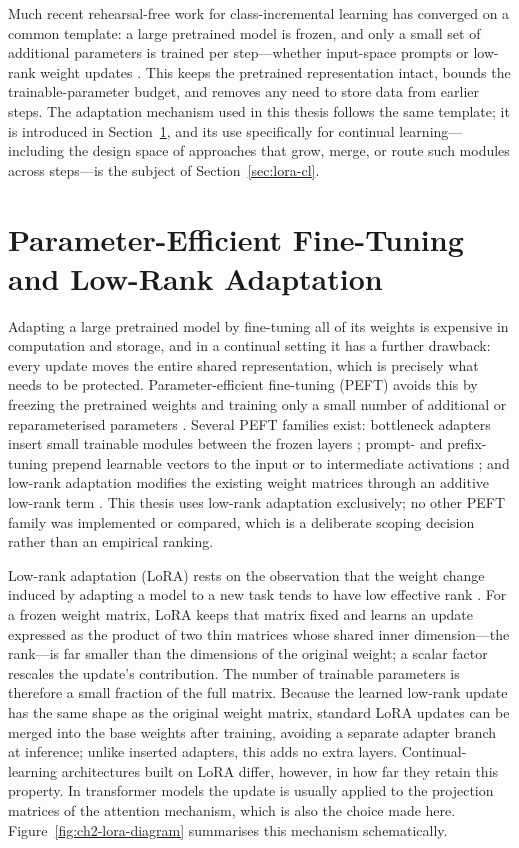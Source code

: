 Much recent rehearsal-free work for class-incremental learning has
converged on a common template: a large pretrained model is frozen, and
only a small set of additional parameters is trained per step---whether
input-space prompts \parencite{wang2022learning} or low-rank weight updates
\parencite{wang2023orthogonal,liang2024inflora}. This
keeps the pretrained representation intact, bounds the trainable-parameter
budget, and removes any need to store data from earlier steps. The
adaptation mechanism used in this thesis follows the same template; it is
introduced in Section~\ref{sec:peft-lora}, and its use specifically for continual learning---%
including the design space of approaches that grow, merge, or route such
modules across steps---is the subject of Section~\ref{sec:lora-cl}.

\section{Parameter-Efficient Fine-Tuning and Low-Rank Adaptation}
\label{sec:peft-lora}

Adapting a large pretrained model by fine-tuning all of its weights is
expensive in computation and storage, and in a continual setting it has a
further drawback: every update moves the entire shared representation,
which is precisely what needs to be protected. Parameter-efficient
fine-tuning (PEFT) avoids this by freezing the pretrained weights and
training only a small number of additional or reparameterised parameters
\parencite{houlsby2019parameter}. Several PEFT families exist: bottleneck adapters
insert small trainable modules between the frozen layers \parencite{houlsby2019parameter};
prompt- and prefix-tuning prepend learnable vectors to the input or
to intermediate activations \parencite{wang2022learning}; and low-rank adaptation
modifies the existing weight matrices through an additive low-rank term
\parencite{hu2021lora}. This thesis uses low-rank adaptation exclusively; no
other PEFT family was implemented or compared, which is a deliberate
scoping decision rather than an empirical ranking.

Low-rank adaptation (LoRA) rests on the observation that the weight change
induced by adapting a model to a new task tends to have low effective rank
\parencite{hu2021lora}. For a frozen weight matrix, LoRA keeps that matrix fixed
and learns an update expressed as the product of two thin matrices whose
shared inner dimension---the rank---is far smaller than the dimensions of
the original weight; a scalar factor rescales the update's contribution.
The number of trainable parameters is therefore a small fraction of the
full matrix. Because the learned low-rank update has the same shape as the
original weight matrix, standard LoRA updates can be merged into the base
weights after training, avoiding a separate adapter branch at inference;
unlike inserted adapters, this adds no extra layers. Continual-learning
architectures built on LoRA differ, however, in how far they retain this
property. In transformer models the update is usually applied to the
projection matrices of the attention mechanism, which is also the choice
made here. Figure~\ref{fig:ch2-lora-diagram} summarises this mechanism
schematically.

